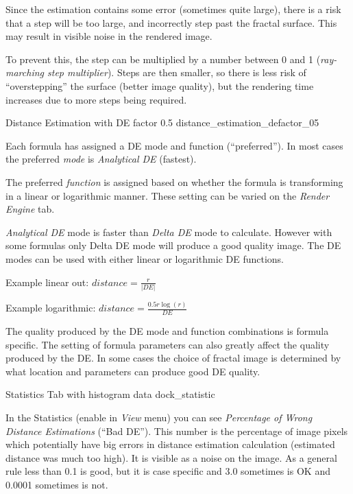 Since the estimation contains some error (sometimes quite large), there is a risk that a step will be too large, and incorrectly step past the fractal surface. This may result in visible noise in the rendered image.

To prevent this, the step can be multiplied by a number between 0 and 1 (\emph{ray-marching step multiplier}). Steps are then smaller, so there is less risk of ``overstepping'' the surface (better image quality), but the rendering time increases due to more steps being required.

\nopagebreak

{Distance Estimation with DE factor 0.5}
{distance_estimation_defactor_05}

Each formula has assigned a DE mode and function (``preferred''). In most cases
the preferred \emph{mode} is \emph{Analytical DE} (fastest).

The preferred \emph{function} is assigned based on whether the formula is
transforming in a linear or logarithmic manner. These setting can be varied on
the \emph{Render Engine} tab.

\emph{Analytical DE} mode is faster than \emph{Delta DE} mode to calculate.
However with some formulas only Delta DE mode will produce a good quality image.
The DE modes can be used with either linear or logarithmic DE functions.

Example linear out: $ distance = \frac{r}{\lvert DE \rvert} $

Example logarithmic: $ distance = \frac{0.5 r  \log(r)}{DE} $

The quality produced by the DE mode and function combinations is formula
specific. The setting of formula parameters can also greatly affect the quality
produced by the DE. In some cases the choice of fractal image is determined by
what location and parameters can produce good DE quality.

\nopagebreak

{Statistics Tab with histogram data}
{dock_statistic}

In the Statistics (enable in \emph{View} menu) you can see \emph{Percentage of
	Wrong Distance Estimations} (``Bad DE''). This number is the percentage of image
pixels which potentially have big errors in distance estimation calculation
(estimated distance was much too high). It is visible as a noise on the image.
As a general rule less than 0.1 is good, but it is case specific and 3.0
sometimes is OK and 0.0001 sometimes is not.

